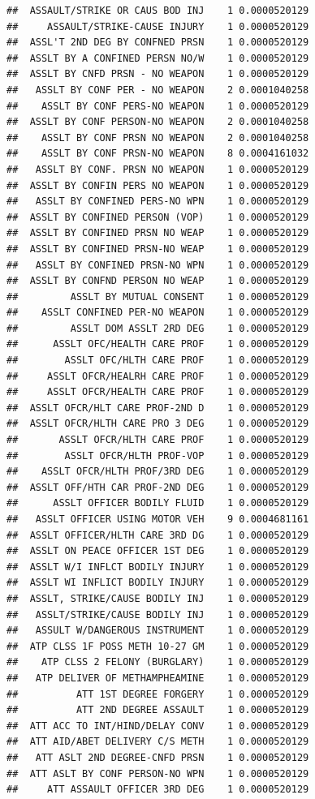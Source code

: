 \documentclass[]{book}
\begin{document}
\begin{verbatim}
##  ASSAULT/STRIKE OR CAUS BOD INJ    1 0.0000520129
##     ASSAULT/STRIKE-CAUSE INJURY    1 0.0000520129
##  ASSL'T 2ND DEG BY CONFNED PRSN    1 0.0000520129
##  ASSLT BY A CONFINED PERSN NO/W    1 0.0000520129
##  ASSLT BY CNFD PRSN - NO WEAPON    1 0.0000520129
##   ASSLT BY CONF PER - NO WEAPON    2 0.0001040258
##    ASSLT BY CONF PERS-NO WEAPON    1 0.0000520129
##  ASSLT BY CONF PERSON-NO WEAPON    2 0.0001040258
##    ASSLT BY CONF PRSN NO WEAPON    2 0.0001040258
##    ASSLT BY CONF PRSN-NO WEAPON    8 0.0004161032
##   ASSLT BY CONF. PRSN NO WEAPON    1 0.0000520129
##  ASSLT BY CONFIN PERS NO WEAPON    1 0.0000520129
##   ASSLT BY CONFINED PERS-NO WPN    1 0.0000520129
##  ASSLT BY CONFINED PERSON (VOP)    1 0.0000520129
##  ASSLT BY CONFINED PRSN NO WEAP    1 0.0000520129
##  ASSLT BY CONFINED PRSN-NO WEAP    1 0.0000520129
##   ASSLT BY CONFINED PRSN-NO WPN    1 0.0000520129
##  ASSLT BY CONFND PERSON NO WEAP    1 0.0000520129
##         ASSLT BY MUTUAL CONSENT    1 0.0000520129
##    ASSLT CONFINED PER-NO WEAPON    1 0.0000520129
##         ASSLT DOM ASSLT 2RD DEG    1 0.0000520129
##      ASSLT OFC/HEALTH CARE PROF    1 0.0000520129
##        ASSLT OFC/HLTH CARE PROF    1 0.0000520129
##     ASSLT OFCR/HEALRH CARE PROF    1 0.0000520129
##     ASSLT OFCR/HEALTH CARE PROF    1 0.0000520129
##  ASSLT OFCR/HLT CARE PROF-2ND D    1 0.0000520129
##  ASSLT OFCR/HLTH CARE PRO 3 DEG    1 0.0000520129
##       ASSLT OFCR/HLTH CARE PROF    1 0.0000520129
##        ASSLT OFCR/HLTH PROF-VOP    1 0.0000520129
##    ASSLT OFCR/HLTH PROF/3RD DEG    1 0.0000520129
##  ASSLT OFF/HTH CAR PROF-2ND DEG    1 0.0000520129
##      ASSLT OFFICER BODILY FLUID    1 0.0000520129
##   ASSLT OFFICER USING MOTOR VEH    9 0.0004681161
##  ASSLT OFFICER/HLTH CARE 3RD DG    1 0.0000520129
##  ASSLT ON PEACE OFFICER 1ST DEG    1 0.0000520129
##  ASSLT W/I INFLCT BODILY INJURY    1 0.0000520129
##  ASSLT WI INFLICT BODILY INJURY    1 0.0000520129
##  ASSLT, STRIKE/CAUSE BODILY INJ    1 0.0000520129
##   ASSLT/STRIKE/CAUSE BODILY INJ    1 0.0000520129
##   ASSULT W/DANGEROUS INSTRUMENT    1 0.0000520129
##  ATP CLSS 1F POSS METH 10-27 GM    1 0.0000520129
##    ATP CLSS 2 FELONY (BURGLARY)    1 0.0000520129
##   ATP DELIVER OF METHAMPHEAMINE    1 0.0000520129
##          ATT 1ST DEGREE FORGERY    1 0.0000520129
##          ATT 2ND DEGREE ASSAULT    1 0.0000520129
##  ATT ACC TO INT/HIND/DELAY CONV    1 0.0000520129
##  ATT AID/ABET DELIVERY C/S METH    1 0.0000520129
##   ATT ASLT 2ND DEGREE-CNFD PRSN    1 0.0000520129
##  ATT ASLT BY CONF PERSON-NO WPN    1 0.0000520129
##     ATT ASSAULT OFFICER 3RD DEG    1 0.0000520129

\end{verbatim}
\end{document}

